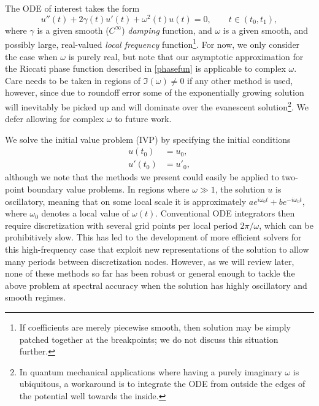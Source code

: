 \documentclass[10pt]{article}
\newcommand{\be}{\begin{equation}}
\newcommand{\ee}{\end{equation}}
\newcommand{\ba}{\begin{align}}
\newcommand{\ea}{\end{align}}
\newcommand{\om}{\omega}
\newcommand{\g}{\gamma}
\begin{document}
The ODE of interest takes the form
\be
u''(t) + 2\g(t) u'(t) + \om^2(t)u(t) = 0, \qquad t \in (t_0,t_1),
\label{ode}
\ee
where $\g$ is a given smooth ($C^\infty$) \emph{damping} function,
and $\om$ is a given smooth, and possibly large, real-valued
\emph{local frequency} function\footnote{If coefficients are merely piecewise smooth, then solution may
be simply patched together at the breakpoints; we do not discuss this situation further.}.
For now, we only consider the case when $\om$ is purely real, but note that our
asymptotic approximation for the Riccati phase function described in
\cref{phasefun} is applicable to complex $\om$. Care needs to be taken in
regions of $\Im(\om) \neq 0$ if any other method is used, however, since due to
roundoff error some of the exponentially growing solution will inevitably be
picked up and will dominate over the evanescent solution\footnote{In quantum
mechanical applications where having a purely imaginary $\om$ is ubiquitous, a
workaround is to integrate the ODE from outside the edges of the potential well
towards the inside.}. We defer allowing for complex $\om$ to future work.

  
We solve the initial value problem (IVP) by specifying the initial conditions
\begin{align} %
    u(t_0) &= u_0, \label{ic0} \\
    u'(t_0) &= u'_0, \label{ic1}
\end{align}
although we note that the methods we present could easily be applied to
two-point boundary value problems.
In regions where $\om \gg 1$, the solution $u$ is oscillatory, meaning that on some local
scale it is approximately $a e^{i\om_0t} + b e^{-i\om_0t}$, where $\om_0$
denotes a local value of $\om(t)$.
Conventional ODE integrators then require discretization with several
grid points per local period $2\pi/\om$, which can be prohibitively slow.
This has led to the development of more efficient solvers for this
high-frequency case that exploit new representations of the solution to allow many periods between discretization nodes.
However, as we will review later, none of these methods so
far has been robust or general enough to
tackle the above problem at spectral accuracy
when the solution has highly oscillatory and smooth regimes. %
\end{document}
